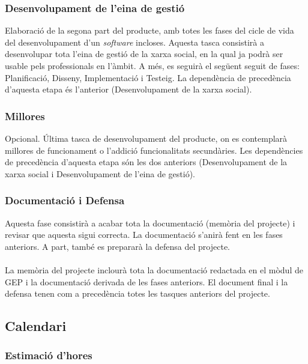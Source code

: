 \documentclass[11pt,catalan,listoffigures,listoftables]{tfgetsinf}
\begin{document}
\subsubsection{Desenvolupament de l’eina de gestió}
Elaboració de la segona part del producte, amb totes les fases del cicle de vida del desenvolupament d’un \textit{software} incloses. Aquesta tasca consistirà a desenvolupar tota l’eina de gestió de la xarxa social, en la qual ja podrà ser usable pels professionals en l’àmbit. A més, es seguirà el següent seguit de fases: Planificació, Disseny, Implementació i Testeig. La dependència de precedència d’aquesta etapa és l’anterior (Desenvolupament de la xarxa social).

\subsubsection{Millores}
Opcional. Última tasca de desenvolupament del producte, on es contemplarà millores de funcionament o l’addició funcionalitats secundàries. Les dependències de precedència d’aquesta etapa són les dos anteriors (Desenvolupament de la xarxa social i Desenvolupament de l’eina de gestió).

\subsubsection{Documentació i Defensa}
Aquesta fase consistirà a acabar tota la documentació (memòria del projecte) i revisar que aquesta sigui correcta. La documentació s’anirà fent en les fases anteriors. A part, també es prepararà la defensa del projecte.\\ \\
La memòria del projecte inclourà tota la documentació redactada en el mòdul de GEP i la documentació derivada de les fases anteriors. El document final i la defensa tenen com a precedència totes les tasques anteriors del projecte.

\subsection{Calendari}

\subsubsection{Estimació d'hores}
\end{document}
